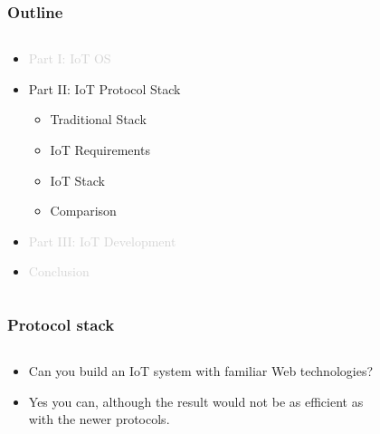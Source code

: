 \documentclass{beamer}
\begin{document}
\begin{frame}
	\frametitle{Outline}
	\begin{columns}[c]
		\begin{column}{30cm}
			\vspace{.1cm}
			\begin{itemize}
				\justifying
				\item \textcolor{LightGray}{Part I: IoT OS}
				\item Part II: IoT Protocol Stack
				\begin{itemize}
					\item Traditional Stack
					\item IoT Requirements
					\item IoT Stack
					\item Comparison
				\end{itemize}
				\item \textcolor{LightGray}{Part III: IoT Development}
				\item \textcolor{LightGray}{Conclusion}
			\end{itemize}
		\end{column}
	\end{columns}
\end{frame}

\begin{frame}
	\frametitle{Protocol stack}
	\begin{columns}[c]
		\begin{column}{30cm}
			\vspace{.1cm}
			\begin{itemize}
				\justifying
				\item<1-> Can you build an IoT system with familiar Web technologies?
				\item<2-> Yes you can, although the result would not be as \textcolor{Ocean}{efficient} as\\
				with the \textcolor{TextGreen}{newer protocols}.
			\end{itemize}
		\end{column}
	\end{columns}
\end{frame}
\end{document}
